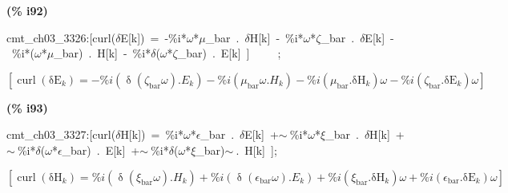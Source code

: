 \documentclass[fleqn]{article}
\begin{document}
\noindent
\begin{minipage}[t]{4.000000em}\color{red}\bfseries
(\% i92)	
\end{minipage}
\begin{minipage}[t]{\textwidth}\color{blue}
cmt\_ch03\_3326:[curl(\ensuremath{\delta}E[k])\ =\ -\%i*\ensuremath{\omega}*\ensuremath{\mu}\_bar\ .\ \ensuremath{\delta}H[k]\ -\ \%i*\ensuremath{\omega}*\ensuremath{\zeta}\_bar\ .\ \ensuremath{\delta}E[k]\ -\ \%i*(\ensuremath{\omega}*\ensuremath{\mu}\_bar)\ .\ H[k]\ -\ \%i*\ensuremath{\delta}(\ensuremath{\omega}*\ensuremath{\zeta}\_bar)\ .\ E[k]\ ]\ \ \ \ \ ;
\end{minipage}
\[\displaystyle \tag{cmt\_ ch03\_ 3326} 
\left[ \operatorname{curl}\left( {{\ensuremath{\mathrm{\delta E}}}_k}\right) =-\% i \left( \operatorname{\delta }\left( {{\zeta }_{\ensuremath{\mathrm{bar}}}} \omega \right) \ensuremath{\mathrm{ . }}{E_k}\right) -\% i \left( {{\mu }_{\ensuremath{\mathrm{bar}}}} \omega \ensuremath{\mathrm{ . }}{H_k}\right) -\% i \left( {{\mu }_{\ensuremath{\mathrm{bar}}}}\ensuremath{\mathrm{ . }}{{\ensuremath{\mathrm{\delta H}}}_k}\right)  \omega -\% i \left( {{\zeta }_{\ensuremath{\mathrm{bar}}}}\ensuremath{\mathrm{ . }}{{\ensuremath{\mathrm{\delta E}}}_k}\right)  \omega \right] \mbox{}
\]


\noindent
\begin{minipage}[t]{4.000000em}\color{red}\bfseries
(\% i93)	
\end{minipage}
\begin{minipage}[t]{\textwidth}\color{blue}
cmt\_ch03\_3327:[curl(\ensuremath{\delta}H[k])\ =\ \%i*\ensuremath{\omega}*\ensuremath{\epsilon}\_bar\ .\ \ensuremath{\delta}E[k]\ +\ensuremath{\sim\ }\%i*\ensuremath{\omega}*\ensuremath{\xi}\_bar\ .\ \ensuremath{\delta}H[k]\ +\ensuremath{\sim\ }\%i*\ensuremath{\delta}(\ensuremath{\omega}*\ensuremath{\epsilon}\_bar)\ .\ E[k]\ +\ensuremath{\sim\ }\%i*\ensuremath{\delta}(\ensuremath{\omega}*\ensuremath{\xi}\_bar)\ensuremath{\sim\ }.\ H[k]\ ];
\end{minipage}
\[\displaystyle \tag{cmt\_ ch03\_ 3327} 
\left[ \operatorname{curl}\left( {{\ensuremath{\mathrm{\delta H}}}_k}\right) =\% i \left( \operatorname{\delta }\left( {{\xi }_{\ensuremath{\mathrm{bar}}}} \omega \right) \ensuremath{\mathrm{ . }}{H_k}\right) +\% i \left( \operatorname{\delta }\left( {{\epsilon }_{\ensuremath{\mathrm{bar}}}} \omega \right) \ensuremath{\mathrm{ . }}{E_k}\right) +\% i \left( {{\xi }_{\ensuremath{\mathrm{bar}}}}\ensuremath{\mathrm{ . }}{{\ensuremath{\mathrm{\delta H}}}_k}\right)  \omega +\% i \left( {{\epsilon }_{\ensuremath{\mathrm{bar}}}}\ensuremath{\mathrm{ . }}{{\ensuremath{\mathrm{\delta E}}}_k}\right)  \omega \right] \mbox{}
\]
\end{document}
